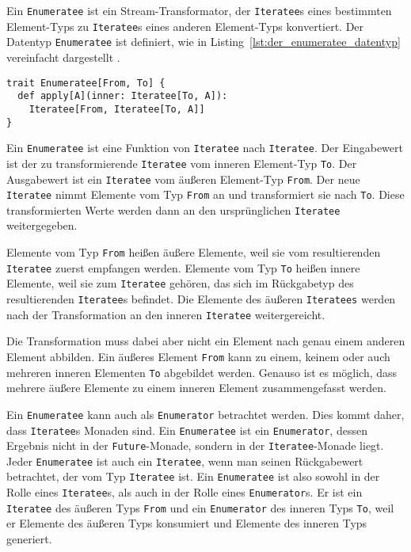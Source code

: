 Ein \lstinline|Enumeratee| ist ein Stream-Transformator, der \lstinline|Iteratee|s eines bestimmten Element-Typs zu \lstinline|Iteratee|s eines anderen Element-Typs konvertiert.
Der Datentyp \lstinline|Enumeratee| ist definiert, wie in Listing~\ref{lst:der_enumeratee_datentyp} vereinfacht dargestellt \cite[vgl.][]{play_enumeratee_source_code}.
\begin{lstlisting}[caption=Der Enumeratee-Datentyp, label=lst:der_enumeratee_datentyp]
trait Enumeratee[From, To] {
  def apply[A](inner: Iteratee[To, A]):
    Iteratee[From, Iteratee[To, A]]
}
\end{lstlisting}

Ein \lstinline|Enumeratee| ist eine Funktion von \lstinline|Iteratee| nach \lstinline|Iteratee|.
Der Eingabewert ist der zu transformierende \lstinline|Iteratee| vom inneren Element-Typ \lstinline|To|.
Der Ausgabewert ist ein \lstinline|Iteratee| vom äußeren Element-Typ \lstinline|From|.
Der neue \lstinline|Iteratee| nimmt Elemente vom Typ \lstinline|From| an und transformiert sie nach \lstinline|To|.
Diese transformierten Werte werden dann an den ursprünglichen \lstinline|Iteratee| weitergegeben.

Elemente vom Typ \lstinline|From| heißen äußere Elemente, weil sie vom resultierenden \lstinline|Iteratee| zuerst empfangen werden.
Elemente vom Typ \lstinline|To| heißen innere Elemente, weil sie zum \lstinline|Iteratee| gehören, das sich im Rückgabetyp des resultierenden \lstinline|Iteratee|s befindet.
Die Elemente des äußeren \lstinline|Iteratees| werden nach der Transformation an den inneren \lstinline|Iteratee| weitergereicht.

Die Transformation muss dabei aber nicht ein Element nach genau einem anderen Element abbilden.
Ein äußeres Element \lstinline|From| kann zu einem, keinem oder auch mehreren inneren Elementen \lstinline|To| abgebildet werden.
Genauso ist es möglich, dass mehrere äußere Elemente zu einem inneren Element zusammengefasst werden.

Ein \lstinline|Enumeratee| kann auch als \lstinline|Enumerator| betrachtet werden.
Dies kommt daher, dass \lstinline|Iteratee|s Monaden sind.
Ein \lstinline|Enumeratee| ist ein \lstinline|Enumerator|, dessen Ergebnis nicht in der \lstinline|Future|-Monade, sondern in der \lstinline|Iteratee|-Monade liegt.
Jeder \lstinline|Enumeratee| ist auch ein \lstinline|Iteratee|, wenn man seinen Rückgabewert betrachtet, der vom Typ \lstinline|Iteratee| ist.
Ein \lstinline|Enumeratee| ist also sowohl in der Rolle eines \lstinline|Iteratee|s, als auch in der Rolle eines \lstinline|Enumerator|s.
Er ist ein \lstinline|Iteratee| des äußeren Typs \lstinline|From| und ein \lstinline|Enumerator| des inneren Typs \lstinline|To|, weil er Elemente des äußeren Typs konsumiert und Elemente des inneren Typs generiert.

